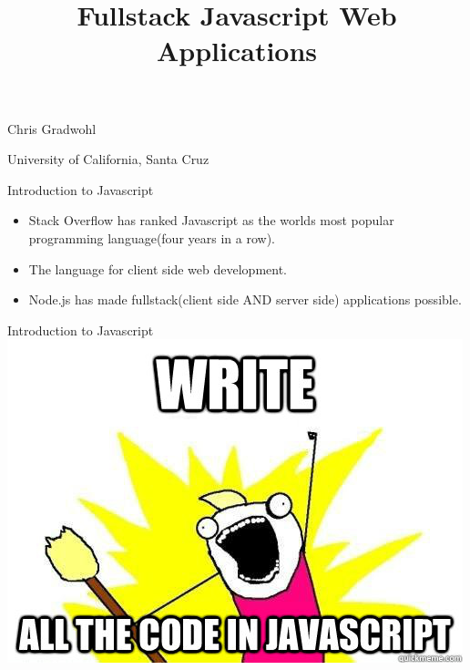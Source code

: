\documentclass{beamer}
\title[Fullstack Javascript Web Applications]{Fullstack Javascript Web Applications}
\author[Chris Gradwohl]{}
\institute[University of California, Santa Cruz]{} %
\date[March 2017]{}
\begin{document}
\begin{frame}
  \titlepage
  \begin{center}
  		Chris Gradwohl \

		University of California, Santa Cruz
  \end{center}
\end{frame}




\begin{frame}{Introduction to Javascript}{}

    \begin{itemize}
	    \item Stack Overflow has ranked Javascript as the worlds most popular programming language(four years in a row).

		\vspace{2em}

	    \item The language for client side web development.
		\vspace{2em}
	    \item Node.js has made fullstack(client side AND server side) applications possible.
		\vspace{2em}
	\end{itemize}
\end{frame}


\begin{frame}{Introduction to Javascript}{}
	\includegraphics[width=\textwidth]{write_all_the_code_in_javascript1.jpg}
\end{frame}
\end{document}
